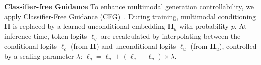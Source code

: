 

\textbf{Classifier-free Guidance} 
To enhance multimodal generation controllability, we apply Classifier-Free Guidance (CFG)~\citep{llamagen}. During training, multimodal conditioning \(\mathbf{H}\) is replaced by a learned unconditional embedding \(\mathbf{H}_u\) with probability \(p\). At inference time, token logits \(\ell_g\) are recalculated by interpolating between the conditional logits \(\ell_c\) (from \(\mathbf{H}\)) and unconditional logits \(\ell_u\) (from \(\mathbf{H}_u\)), controlled by a scaling parameter \(\lambda\):
\(\ell_g = \ell_u + (\ell_c - \ell_u) \times \lambda\).





